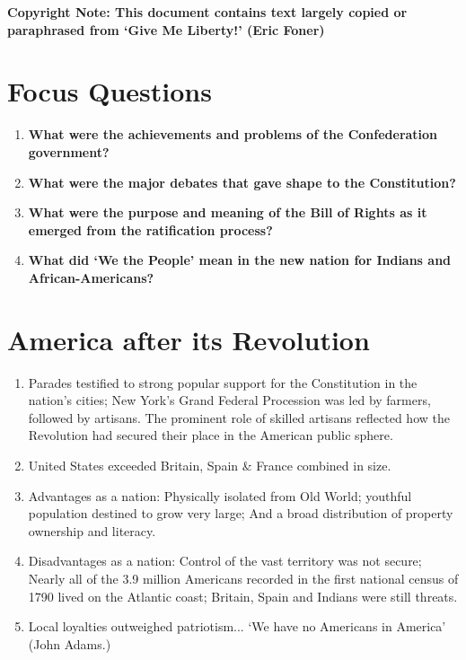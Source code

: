 \documentclass{article}
\begin{document}
  \textbf{Copyright Note: This document contains text largely copied or paraphrased from `Give Me Liberty!' (Eric Foner)}
  \tableofcontents
  \newpage

  \section{Focus Questions}
  \begin{enumerate}
    \item \textbf{What were the achievements and problems of the Confederation government?}
    \item \textbf{What were the major debates that gave shape to the Constitution?}
    \item \textbf{What were the purpose and meaning of the Bill of Rights as it emerged from the ratification process?}
    \item \textbf{What did `We the People' mean in the new nation for Indians and African-Americans?}
  \end{enumerate}

  \section{America after its Revolution}
    \begin{enumerate}
      \item Parades testified to strong popular support for the Constitution in the nation's cities; New York's Grand Federal Procession was led by farmers, followed by artisans. The prominent role of skilled artisans reflected how the Revolution had secured their place in the American public sphere.
      \item United States exceeded Britain, Spain \& France combined in size. 
      \item Advantages as a nation: Physically isolated from Old World; youthful population destined to grow very large; And a broad distribution of property ownership and literacy. 
      \item Disadvantages as a nation: Control of the vast territory was not secure; Nearly all of the 3.9 million Americans recorded in the first national census of 1790 lived on the Atlantic coast; Britain, Spain and Indians were still threats.
      \item Local loyalties outweighed patriotism... `We have no Americans in America' (John Adams.)
    \end{enumerate}
\end{document}
